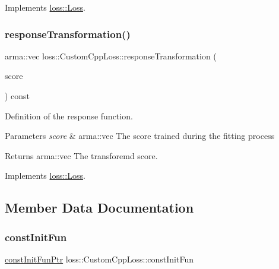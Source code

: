 Implements \mbox{\hyperlink{classloss_1_1_loss_ae9f94dd9b8311397583ba3a9cb485e94}{loss\+::\+Loss}}.

\mbox{\label{classloss_1_1_custom_cpp_loss_a8ef296a7db08423f68dd389824b5aa77}} 
\subsubsection{\texorpdfstring{response\+Transformation()}{responseTransformation()}}
{\footnotesize\ttfamily arma\+::vec loss\+::\+Custom\+Cpp\+Loss\+::response\+Transformation (\begin{DoxyParamCaption}\item[{const arma\+::vec \&}]{score }\end{DoxyParamCaption}) const\hspace{0.3cm}{\ttfamily [virtual]}}



Definition of the response function. 


\begin{DoxyParams}{Parameters}
{\em score} & {\ttfamily arma\+::vec} The score trained during the fitting process\\
\hline
\end{DoxyParams}
\begin{DoxyReturn}{Returns}
{\ttfamily arma\+::vec} The transforemd score. 
\end{DoxyReturn}


Implements \mbox{\hyperlink{classloss_1_1_loss_a0a84b7df79b08e40b538aaa7e6ee75c4}{loss\+::\+Loss}}.



\subsection{Member Data Documentation}
\mbox{\label{classloss_1_1_custom_cpp_loss_a34729cf071027991d7395b5d0ef86624}} 
\subsubsection{\texorpdfstring{const\+Init\+Fun}{constInitFun}}
{\footnotesize\ttfamily \mbox{\hyperlink{namespaceloss_af21a5d5ed7431ecbc73730ce2bde3987}{const\+Init\+Fun\+Ptr}} loss\+::\+Custom\+Cpp\+Loss\+::const\+Init\+Fun\hspace{0.3cm}{\ttfamily [private]}}



